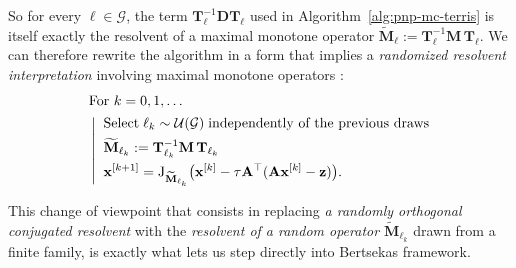 \documentclass{article}
\newcommand{\R}{\mathbb{R}}
\newcommand{\xb}{\mathbf{x}}
\newcommand{\Ab}{\mathbf{A}}
\newcommand{\zb}{\mathbf{z}}
\begin{document}
So for every $\ell \in \mathcal{G}$, the term $\mathbf{T}_\ell^{-1}   \mathbf{D} \mathbf{T}_\ell$ used
in Algorithm~\eqref{alg:pnp-mc-terris} is itself exactly the resolvent
of a maximal monotone operator $\widetilde{\mathbf{M}}_\ell := \mathbf{T}_\ell^{-1} \mathbf{M}\, \mathbf{T}_\ell$. We can
therefore rewrite the algorithm in a form that implies a \textit{randomized resolvent interpretation} involving maximal monotone
operators :
\begin{align}
\label{alg:pnp-mc-terris-J}
    &\text{For } k=0,1,\dots \nonumber\\
    &\left|
    \begin{aligned}
        &\;\;\text{Select} \;\ell_k \sim \mathcal{U}(\mathcal{G}) \;\text{independently of the previous draws}\\
        &\;\; \widetilde{\mathbf{M}}_{\ell_k} := \mathbf{T}_{\ell_k}^{-1} \mathbf{M}\, \mathbf{T}_{\ell_k}\\
        &\;\;\xb^{[k+1]} = \mathrm{J}_{\widetilde{\mathbf{M}}_{\ell_k}} \big(\xb^{[k]} - \tau \Ab^\top (\Ab\xb^{[k]} - \zb)\big).
    \end{aligned}
    \right.\raisetag{17pt}
\end{align}\vspace{-0.1cm}
%
%

\noindent This change of viewpoint that consists in replacing \textit{a randomly orthogonal conjugated
resolvent} with the \textit{resolvent of a random operator $\widetilde{\mathbf{M}}_{\ell_k}$} drawn
from a finite family, is exactly what lets us step directly into
Bertsekas framework.%
\\\vspace{-0.2cm}
\end{document}
